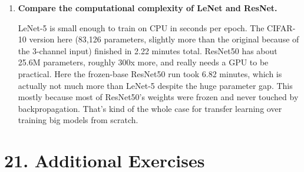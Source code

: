 \documentclass[11pt]{article}
\begin{document}
\begin{enumerate}
\item \textbf{Compare the computational complexity of LeNet and ResNet.}

LeNet-5 is small enough to train on CPU in seconds per epoch. The CIFAR-10
version here (83,126 parameters, slightly more than the original because of
the 3-channel input) finished in 2.22 minutes total. ResNet50 has about
25.6M parameters, roughly 300x more, and really needs a GPU to be practical.
Here the frozen-base ResNet50 run took 6.82 minutes, which is actually not
much more than LeNet-5 despite the huge parameter gap. This mostly because most
of ResNet50's weights were frozen and never touched by backpropagation. That's
kind of the whole case for transfer learning over training big models from
scratch.

\end{enumerate}


\section*{21. Additional Exercises}
\end{document}

